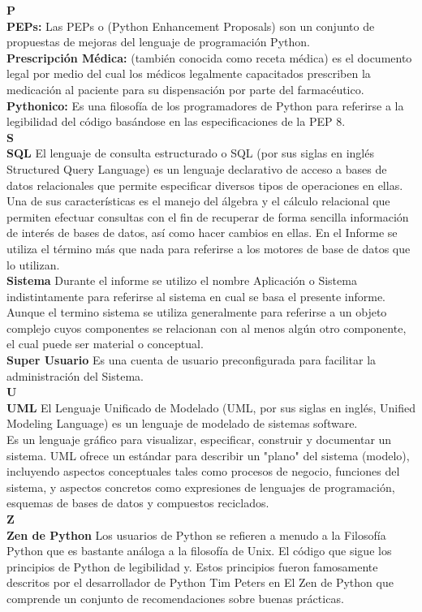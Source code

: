 {\LARGE \textbf{P}}
\\[0.1cm]
\textbf{PEPs:} Las PEPs o (Python Enhancement Proposals) son un conjunto de propuestas de mejoras del lenguaje de programación Python.
\\[0.1cm]
\textbf{Prescripción Médica:} (también conocida como receta médica) es el documento legal por medio del cual los médicos legalmente capacitados prescriben la medicación al paciente  para su dispensación por parte del farmacéutico.
\\[0.1cm]
\textbf{Pythonico:} Es una filosofía de los programadores de Python para referirse a la legibilidad del código basándose en las especificaciones de la PEP 8.
\\[0.5cm]

{\LARGE \textbf{S}}
\\[0.1cm]
\textbf{SQL} El lenguaje de consulta estructurado o SQL (por sus siglas en inglés Structured Query Language) es un lenguaje declarativo de acceso a bases de datos relacionales que permite especificar diversos tipos de operaciones en ellas. Una de sus características es el manejo del álgebra y el cálculo relacional que permiten efectuar consultas con el fin de recuperar de forma sencilla información de interés de bases de datos, así como hacer cambios en ellas. En el Informe se utiliza el término más que nada para referirse a los motores de base de datos que lo utilizan.
\\
\textbf{Sistema} Durante el informe se utilizo el nombre Aplicación o Sistema indistintamente para referirse al sistema en cual se basa el presente informe. Aunque el termino sistema se utiliza generalmente para referirse a un objeto complejo cuyos componentes se relacionan con al menos algún otro componente, el cual puede ser material o conceptual.
\\[0.1cm]
\textbf{Super Usuario} Es una cuenta de usuario preconfigurada para facilitar la administración del Sistema.
\\[0.5cm]

{\LARGE \textbf{U}}
\\[0.1cm]
\textbf{UML} El Lenguaje Unificado de Modelado (UML, por sus siglas en inglés, Unified Modeling Language) es un lenguaje de modelado de sistemas software. 
\\
Es un lenguaje gráfico para visualizar, especificar, construir y documentar un sistema. UML ofrece un estándar para describir un "plano" del sistema (modelo), incluyendo aspectos conceptuales tales como procesos de negocio, funciones del sistema, y aspectos concretos como expresiones de lenguajes de programación, esquemas de bases de datos y compuestos reciclados.
\\[0.5cm]

{\LARGE \textbf{Z}}
\\[0.1cm]
\textbf{Zen de Python} Los usuarios de Python se refieren a menudo a la Filosofía Python que es bastante análoga a la filosofía de Unix. El código que sigue los principios de Python de legibilidad y.  Estos principios fueron famosamente descritos por el desarrollador de Python Tim Peters en El Zen de Python que comprende un conjunto de recomendaciones sobre buenas prácticas.
\\[0.5cm]

